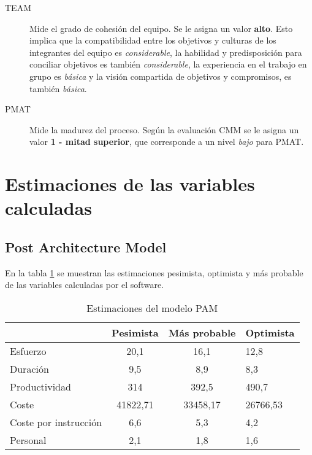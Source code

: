 \documentclass[11pt,a4paper,spanish,twoside]{report}
\begin{document}
\begin{description}
\item[TEAM] Mide el grado de cohesión del equipo. Se le asigna un valor
\textbf{alto}. Esto implica que la compatibilidad entre los objetivos y
culturas de los integrantes del equipo es \emph{considerable}, la habilidad
y predisposición para conciliar objetivos es también \emph{considerable}, la
experiencia en el trabajo en grupo es \emph{básica} y la visión compartida
de objetivos y compromisos, es también \emph{básica}.

\item[PMAT] Mide la madurez del proceso. Según la evaluación CMM se le asigna
un valor \textbf{1 - mitad superior}, que corresponde a un nivel \emph{bajo}
para PMAT.
\end{description}

\section{Estimaciones de las variables calculadas}
\subsection{Post Architecture Model}
En la tabla \ref{Tab:EstPAM} se muestran las estimaciones pesimista,
optimista y más probable de las variables calculadas por el software.
\begin{table}[!h]
  \centering
  \begin{tabular}{p{4.5cm}|c|c|b{2cm}<{\centering}}
    & \textbf{Pesimista} & \textbf{Más probable} & \textbf{Optimista} \\
    \hline \hline
    Esfuerzo              & 20,1     & 16,1     & 12,8     \\ \hline
    Duración              & 9,5      & 8,9      & 8,3      \\ \hline
    Productividad         & 314      & 392,5    & 490,7    \\ \hline
    Coste                 & 41822,71 & 33458,17 & 26766,53 \\ \hline
    Coste por instrucción & 6,6      & 5,3      & 4,2      \\ \hline
    Personal              & 2,1      & 1,8      & 1,6      \\ \hline
  \end{tabular}
  \caption{Estimaciones del modelo PAM} \label{Tab:EstPAM}
\end{table}
\end{document}
